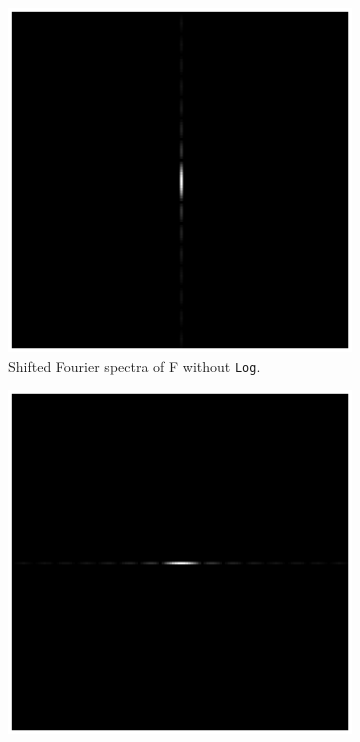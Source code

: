 \documentclass[11pt,a4paper]{article}
\begin{document}
\begin{figure}[!ht]
	\footnotesize
	\centering 
	\begin{subfigure}[t]{.32\linewidth} %
	\includegraphics[width=\columnwidth]{Linearity_Fhat_Shift_Abs.eps}
	\caption{Shifted Fourier spectra of F without \texttt{Log}.}
	\label{fig:Fhat_Shift_Abs}
	\end{subfigure}
	\begin{subfigure}[t]{.32\linewidth} %
	\includegraphics[width=\columnwidth]{Linearity_Ghat_Shift_Abs.eps}

\end{subfigure}
\end{figure}
\end{document}
